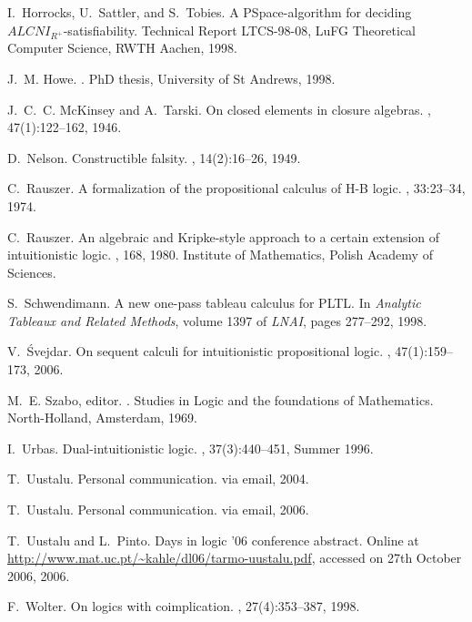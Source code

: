 \documentclass{llncs}
\numberwithin{equation}{section}
\begin{document}
\begin{thebibliography}{10}
I.~Horrocks, U.~Sattler, and S.~Tobies.
\newblock A {PS}pace-algorithm for deciding ${ALCNI}_{R^+}$-satisfiability.
\newblock Technical Report LTCS-98-08, LuFG Theoretical Computer Science, RWTH
  Aachen, 1998.

J.~M. Howe.
.
\newblock PhD thesis, University of St Andrews, 1998.

J.~C.~C. McKinsey and A.~Tarski.
\newblock On closed elements in closure algebras.
, 47(1):122--162, 1946.

D.~Nelson.
\newblock Constructible falsity.
, 14(2):16--26, 1949.

C.~Rauszer.
\newblock A formalization of the propositional calculus of {H-B} logic.
, 33:23--34, 1974.

C.~Rauszer.
\newblock An algebraic and {K}ripke-style approach to a certain extension of
  intuitionistic logic.
, 168, 1980.
\newblock Institute of Mathematics, Polish Academy of Sciences.

S.~Schwendimann.
\newblock A new one-pass tableau calculus for {PLTL}.
\newblock In {\em Analytic Tableaux and Related Methods}, volume 1397 of {\em
  LNAI}, pages 277--292, 1998.

V.~{\'S}vejdar.
\newblock On sequent calculi for intuitionistic propositional logic.
,
  47(1):159--173, 2006.

M.~E. Szabo, editor.
.
\newblock Studies in Logic and the foundations of Mathematics. North-Holland,
  Amsterdam, 1969.

I.~Urbas.
\newblock Dual-intuitionistic logic.
, 37(3):440--451, Summer
  1996.

T.~Uustalu.
\newblock Personal communication.
\newblock via email, 2004.

T.~Uustalu.
\newblock Personal communication.
\newblock via email, 2006.

T.~Uustalu and L.~Pinto.
\newblock Days in logic '06 conference abstract.
\newblock Online at \url{http://www.mat.uc.pt/~kahle/dl06/tarmo-uustalu.pdf},
  accessed on 27th October 2006, 2006.

F.~Wolter.
\newblock On logics with coimplication.
, 27(4):353--387, 1998.

\end{thebibliography}
\end{document}
